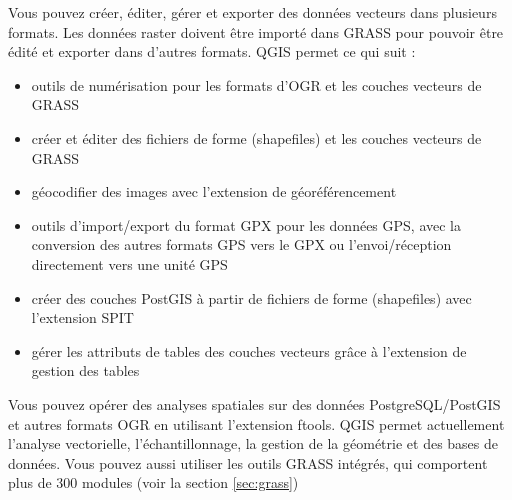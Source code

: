 

Vous pouvez cr\'eer, \'editer, g\'erer et exporter des donn\'ees vecteurs dans plusieurs formats. Les donn\'ees raster doivent \^etre import\'e dans GRASS pour pouvoir \^etre \'edit\'e et exporter dans d'autres formats. QGIS permet ce qui suit :  

\begin{itemize}
\item outils de num\'erisation pour les formats d'OGR et les couches vecteurs de GRASS
\item cr\'eer et \'editer des fichiers de forme (shapefiles) et les couches vecteurs de GRASS
\item g\'eocodifier des images avec l'extension de g\'eor\'ef\'erencement
\item outils d'import/export du format GPX pour les donn\'ees GPS, avec la conversion des autres formats GPS vers le GPX ou l'envoi/r\'eception directement vers une unit\'e GPS
\item cr\'eer des couches PostGIS \`a partir de fichiers de forme (shapefiles) avec l'extension SPIT
\item g\'erer les attributs de tables des couches vecteurs gr\^ace \`a l'extension de gestion des tables
\end{itemize}


Vous pouvez op\'erer des analyses spatiales sur des donn\'ees PostgreSQL/PostGIS et autres formats OGR en utilisant l'extension ftools. QGIS permet actuellement l'analyse vectorielle, l'\'echantillonnage, la gestion de la g\'eom\'etrie et des bases de donn\'ees. Vous pouvez aussi utiliser les outils GRASS int\'egr\'es, qui comportent plus de 300 modules (voir la section \ref{sec:grass})


